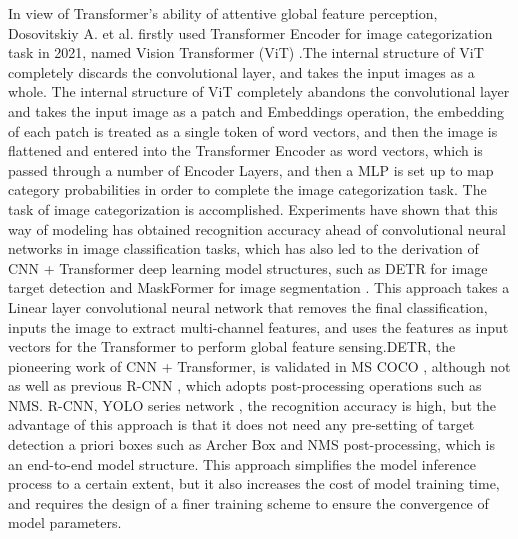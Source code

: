 \documentclass{article}
\begin{document}
In view of Transformer's ability of attentive global feature perception, Dosovitskiy A. et al. firstly used Transformer Encoder for image categorization task in 2021, named Vision Transformer (ViT) \cite{10}.The internal structure of ViT completely discards the convolutional layer, and takes the input images as a whole. The internal structure of ViT completely abandons the convolutional layer and takes the input image as a patch and Embeddings operation, the embedding of each patch is treated as a single token of word vectors, and then the image is flattened and entered into the Transformer Encoder as word vectors, which is passed through a number of Encoder Layers, and then a MLP is set up to map category probabilities in order to complete the image categorization task. The task of image categorization is accomplished. Experiments have shown that this way of modeling has obtained recognition accuracy ahead of convolutional neural networks in image classification tasks, which has also led to the derivation of CNN + Transformer deep learning model structures, such as DETR for image target detection \cite{11} and MaskFormer for image segmentation \cite{12}. This approach takes a Linear layer convolutional neural network that removes the final classification, inputs the image to extract multi-channel features, and uses the features as input vectors for the Transformer to perform global feature sensing.DETR, the pioneering work of CNN + Transformer, is validated in MS COCO \cite{13}, although not as well as previous R-CNN \cite{14}, which adopts post-processing operations such as NMS. R-CNN, YOLO series network \cite{15}, the recognition accuracy is high, but the advantage of this approach is that it does not need any pre-setting of target detection a priori boxes such as Archer Box and NMS post-processing, which is an end-to-end model structure. This approach simplifies the model inference process to a certain extent, but it also increases the cost of model training time, and requires the design of a finer training scheme to ensure the convergence of model parameters.
\end{document}
